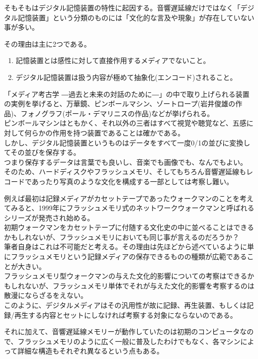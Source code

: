 \documentclass[a4paper,report]{jsbook}
\begin{document}
そもそもはデジタル記憶装置の特性に起因する。音響遅延線だけではなく「デジタル記憶装置」という分類のものには「文化的な言及や現象」が存在していない事が多い。

その理由は主に2つである。

\begin{enumerate}
\def\labelenumi{\arabic{enumi}.}
\tightlist
\item
  記憶装置とは感性に対して直接作用するメディアでないこと。
\item
  デジタル記憶装置は扱う内容が極めて抽象化(エンコード)されること。
\end{enumerate}

「メディア考古学
―過去と未来の対話のために―」の中で取り上げられる装置の実例を挙げると、万華鏡、ピンボールマシン、ゾートロープ(岩井俊雄の作品)、フォノグラフ(ポール・デマリニスの作品)などが挙げられる。\\
ピンボールマシンはともかく、それ以外の三者はすべて視覚や聴覚など、五感に対して何らかの作用を持つ装置であることは確かである。\\
しかし、デジタル記憶装置というものはデータをすべて一度0/1の並びに変換してその並びを保存する。\\
つまり保存するデータは言葉でも良いし、音楽でも画像でも、なんでもよい。\\
そのため、ハードディスクやフラッシュメモリ、そしてもちろん音響遅延線もレコードであったり写真のような文化を構成する一部としては考察し難い。

例えば最初は記録メディアがカセットテープであったウォークマンのことを考えてみると、1999年にフラッシュメモリ式のネットワークウォークマンと呼ばれるシリーズが発売され始める。\\
初期ウォークマンをカセットテープに付随する文化史の中に並べることはできるかもしれないが、フラッシュメモリにおいても同じ事が言えるのだろうか？\\
筆者自身はこれは不可能だと考える。その理由は先ほどから述べているように単にフラッシュメモリという記録メディアの保存できるものの種類が広範であることが大きい。\\
フラッシュメモリ型ウォークマンの与えた文化的影響についての考察はできるかもしれないが、フラッシュメモリ単体でそれが与えた文化的影響を考察するのは散漫にならざるをえない。\\
このように、デジタルメディアはその汎用性が故に記録、再生装置、もしくは記録/再生する内容とセットにしなければ考察する対象にならないのである。

それに加えて、音響遅延線メモリーが動作していたのは初期のコンピュータなので、フラッシュメモリのように広く一般に普及したわけでもなく、各マシンによって詳細な構造もそれぞれ異なるという点もある。
\end{document}
